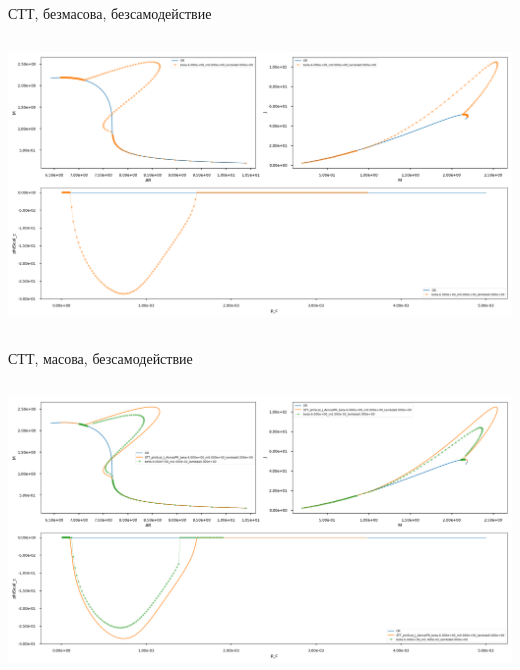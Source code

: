 \documentclass[10pt,a4paper]{beamer}
\begin{document}
        \begin{frame}{ СТТ, безмасова, безсамодействие }
            \begin{columns}
                \begin{column}{\textwidth}
                    \includegraphics[width=\textwidth]{images/STT_beta-6_m0_lambda0.png}
                \end{column}
            \end{columns}
        \end{frame}
    
        \begin{frame}{ СТТ, масова, безсамодействие }
            \begin{columns}
                \begin{column}{\textwidth}
                    \includegraphics[width=\textwidth]{images/STT_beta-6_m1e-2_lambda0.png}
                \end{column}
            \end{columns}
        \end{frame}
    
\end{document}
